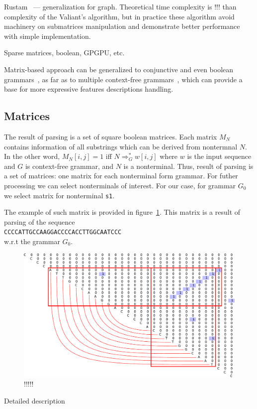 \documentclass[a4paper,twoside]{article}
\begin{document}
Rustam~\cite{Azimov:2018:CPQ:3210259.3210264} --- generalization for graph. Theoretical time complexity is !!! than complexity of the Valiant's algorithm, but in practice these algorithm avoid machinery on submatrices manipulation and demonstrate better performance with simple implementation.

Sparse matrices, boolean, GPGPU, etc.

Matrix-based approach can be generalized to conjunctive and even boolean grammars~\cite{OKHOTIN2014101}, as far as to multiple context-free grammars~\cite{mcfgMatrices}, which can provide a base for more expressive features descriptions handling.

\subsection{Matrices}

\noindent The result of parsing is a set of square boolean matrices. 
Each matrix $M_N$ contains information of all substrings which can be derived from nontermnal $N$.
In the other word, $M_N[i,j]=1$ iff $N \Rightarrow^*_G w[i,j]$ where $w$ is the input sequence and $G$ is context-free grammar, and $N$ is a nonterminal.
Thus, result of parsing is a set of matrices: one matrix for each nonterminal form grammar.
For futher processing we can select nonterminals of interest.
For our case, for grammar $G_0$ we select matrix for nonterminal \verb|s1|.

The example of such matrix is provided in figure~\ref{fig:matrix-simple-stem}.
This matrix is a result of parsing of the sequence \\ \texttt{CCCCATTGCCAAGGACCCCACCTTGGCAATCCC} \\ w.r.t the grammar $G_0$.

\begin{figure}
\centering
\includegraphics[width=.5\textwidth]{figures/4.pdf}
\caption{!!!!!}
\label{fig:matrix-simple-stem}
\end{figure}

Detailed description
\end{document}
